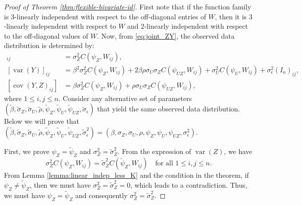 \documentclass[11pt]{article}
\theoremstyle{definition}
\theoremstyle{remark}
\DeclareMathOperator{\var}{var}
\DeclareMathOperator{\cov}{cov}
\begin{document}
\begin{proof}[Proof of Theorem \ref{thm:flexible-bivariate-id}]
First note that if the function family is $3$-linearly independent with respect to the off-diagonal entries of $W$, then it is $3$-linearly independent with respect to $W$ and $2$-linearly independent with respect to the off-diagonal values of $W$. Now, from \eqref{eq:joint_ZY}, the observed data distribution is determined by: 
\begin{align*}
[\var(Z)]_{ij} &= \sigma_Z^2 C(\psi_Z, W_{ij}),\\
[\var(Y)]_{ij} &= \beta^2 \sigma_Z^2 C(\psi_{Z}, W_{ij}) + 2\beta\rho \sigma_U\sigma_ZC(\psi_{UZ}, W_{ij}) +  \sigma_U^2 C(\psi_{U}, W_{ij}) + \sigma_\epsilon^2(I_n)_{ij} , \\
[\cov (Y,Z)_{ij}] &= \beta \sigma_Z^2 C(\psi_{Z}, W_{ij}) + \rho\sigma_U\sigma_Z C(\psi_{UZ}, W_{ij}),
\end{align*} 
where $1\le i, j \le n.$
Consider any alternative set of parameters $(\tilde\beta, \tilde\sigma_Z, \tilde\sigma_U, \tilde\rho, \tilde\psi_Z, \tilde\psi_U, \tilde\psi_{UZ}, \tilde\sigma_\epsilon)$ that yield the same observed data distribution. 
Below we will prove that $(\tilde\beta, \tilde\sigma_Z, \tilde\sigma_U, \tilde\rho, \tilde\psi_Z, \tilde\psi_U, \tilde\psi_{UZ}, \tilde\sigma_\epsilon^2) = (\beta, \sigma_Z, \sigma_U, \rho, \psi_Z, \psi_U, \psi_{UZ}, \sigma_\epsilon^2)$. 

First, we prove $\psi_Z = \tilde \psi_Z$ and $\sigma_Z^2 = \tilde\sigma_Z^2$. 
From the expression of $\var(Z)$, we have
\[\sigma_Z^2 C(\psi_{Z}, W_{ij}) = \tilde\sigma_Z^2 C(\tilde{\psi}_{Z}, W_{ij})
\quad 
\text{for all $1\le i,j \le n$}.
\]   
From Lemma \ref{lemma:linear_indep_less_K} and the condition in the theorem, 
if $\psi_Z \neq \tilde\psi_Z$, then we must have $\sigma_Z^2 = \tilde\sigma_Z^2=0$, which leads to a contradiction. 
Thus, we must have $\psi_Z = \tilde \psi_Z$ and consequently $\sigma_Z^2 = \tilde\sigma_Z^2$. 



\end{proof}
\end{document}
